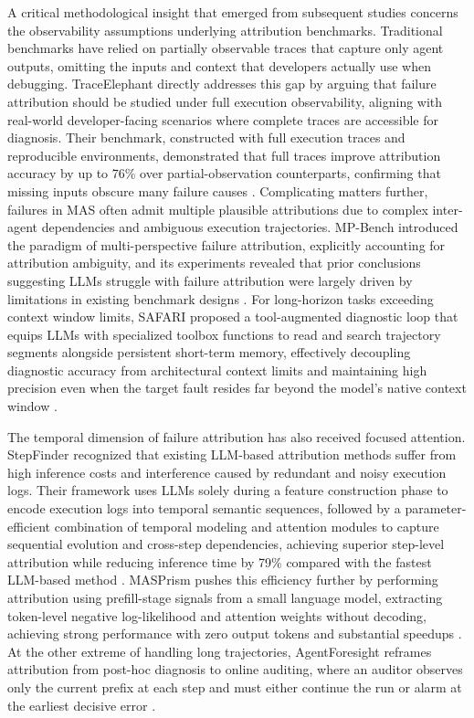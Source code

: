 \documentclass[11pt]{article}
\begin{document}
A critical methodological insight that emerged from subsequent studies concerns the observability assumptions underlying attribution benchmarks. Traditional benchmarks have relied on partially observable traces that capture only agent outputs, omitting the inputs and context that developers actually use when debugging. TraceElephant directly addresses this gap by arguing that failure attribution should be studied under full execution observability, aligning with real-world developer-facing scenarios where complete traces are accessible for diagnosis. Their benchmark, constructed with full execution traces and reproducible environments, demonstrated that full traces improve attribution accuracy by up to 76\% over partial-observation counterparts, confirming that missing inputs obscure many failure causes \cite{ref345}. Complicating matters further, failures in MAS often admit multiple plausible attributions due to complex inter-agent dependencies and ambiguous execution trajectories. MP-Bench introduced the paradigm of multi-perspective failure attribution, explicitly accounting for attribution ambiguity, and its experiments revealed that prior conclusions suggesting LLMs struggle with failure attribution were largely driven by limitations in existing benchmark designs \cite{ref346}. For long-horizon tasks exceeding context window limits, SAFARI proposed a tool-augmented diagnostic loop that equips LLMs with specialized toolbox functions to read and search trajectory segments alongside persistent short-term memory, effectively decoupling diagnostic accuracy from architectural context limits and maintaining high precision even when the target fault resides far beyond the model's native context window \cite{ref362}.

The temporal dimension of failure attribution has also received focused attention. StepFinder recognized that existing LLM-based attribution methods suffer from high inference costs and interference caused by redundant and noisy execution logs. Their framework uses LLMs solely during a feature construction phase to encode execution logs into temporal semantic sequences, followed by a parameter-efficient combination of temporal modeling and attention modules to capture sequential evolution and cross-step dependencies, achieving superior step-level attribution while reducing inference time by 79\% compared with the fastest LLM-based method \cite{ref363}. MASPrism pushes this efficiency further by performing attribution using prefill-stage signals from a small language model, extracting token-level negative log-likelihood and attention weights without decoding, achieving strong performance with zero output tokens and substantial speedups \cite{ref364}. At the other extreme of handling long trajectories, AgentForesight reframes attribution from post-hoc diagnosis to online auditing, where an auditor observes only the current prefix at each step and must either continue the run or alarm at the earliest decisive error \cite{ref365}.
\end{document}
